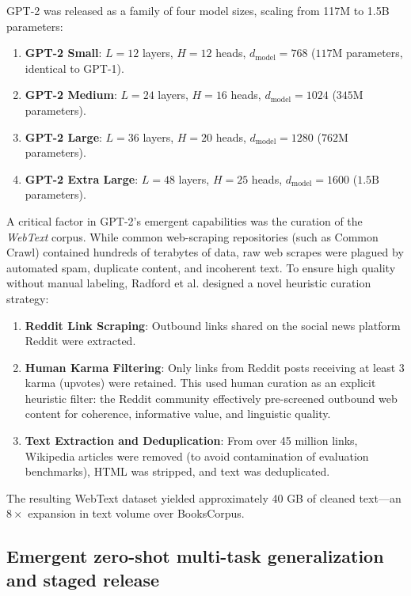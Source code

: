 \documentclass[../../main.tex]{subfiles}
\begin{document}
GPT-2 was released as a family of four model sizes, scaling from 117M to 1.5B parameters:
\begin{enumerate}
    \item \textbf{GPT-2 Small}: $L = 12$ layers, $H = 12$ heads, $d_{\text{model}} = 768$ ($117\text{M}$ parameters, identical to GPT-1).
    \item \textbf{GPT-2 Medium}: $L = 24$ layers, $H = 16$ heads, $d_{\text{model}} = 1024$ ($345\text{M}$ parameters).
    \item \textbf{GPT-2 Large}: $L = 36$ layers, $H = 20$ heads, $d_{\text{model}} = 1280$ ($762\text{M}$ parameters).
    \item \textbf{GPT-2 Extra Large}: $L = 48$ layers, $H = 25$ heads, $d_{\text{model}} = 1600$ ($1.5\text{B}$ parameters).
\end{enumerate}

A critical factor in GPT-2's emergent capabilities was the curation of the \emph{WebText} corpus. While common web-scraping repositories (such as Common Crawl) contained hundreds of terabytes of data, raw web scrapes were plagued by automated spam, duplicate content, and incoherent text. To ensure high quality without manual labeling, Radford et al. designed a novel heuristic curation strategy:
\begin{enumerate}
    \item \textbf{Reddit Link Scraping}: Outbound links shared on the social news platform Reddit were extracted.
    \item \textbf{Human Karma Filtering}: Only links from Reddit posts receiving at least 3 karma (upvotes) were retained. This used human curation as an explicit heuristic filter: the Reddit community effectively pre-screened outbound web content for coherence, informative value, and linguistic quality.
    \item \textbf{Text Extraction and Deduplication}: From over 45 million links, Wikipedia articles were removed (to avoid contamination of evaluation benchmarks), HTML was stripped, and text was deduplicated.
\end{enumerate}
The resulting WebText dataset yielded approximately 40 GB of cleaned text—an $8\times$ expansion in text volume over BooksCorpus.


\subsection{Emergent zero-shot multi-task generalization and staged release}
\label{subsec:gpt2_zeroshot}
\end{document}

